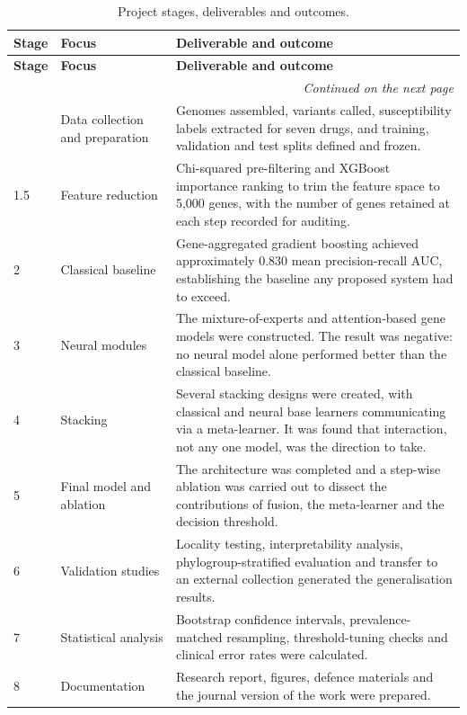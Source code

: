 {\small\setlength{\tabcolsep}{5pt}
\begin{longtable}{|l|>{\raggedright\arraybackslash}p{3.0cm}|>{\raggedright\arraybackslash}p{9.6cm}|}
\caption{Project stages, deliverables and outcomes.}
\label{tab:phases}\\
\hline
\textbf{Stage} & \textbf{Focus} & \textbf{Deliverable and outcome} \\
\hline
\endfirsthead
\hline
\textbf{Stage} & \textbf{Focus} & \textbf{Deliverable and outcome} \\
\hline
\endhead
\hline
\multicolumn{3}{r}{\footnotesize\textit{Continued on the next page}}\\
\endfoot
\hline
\endlastfoot
1 & Data collection and preparation &
Genomes assembled, variants called, susceptibility labels extracted for seven drugs, and
training, validation and test splits defined and frozen. \\
\hline
1.5 & Feature reduction &
Chi-squared pre-filtering and XGBoost importance ranking to trim the feature space to
5{,}000 genes, with the number of genes retained at each step recorded for auditing. \\
\hline
2 & Classical baseline &
Gene-aggregated gradient boosting achieved approximately 0.830 mean precision-recall AUC,
establishing the baseline any proposed system had to exceed. \\
\hline
3 & Neural modules &
The mixture-of-experts and attention-based gene models were constructed. The result was
negative: no neural model alone performed better than the classical baseline. \\
\hline
4 & Stacking &
Several stacking designs were created, with classical and neural base learners communicating
via a meta-learner. It was found that interaction, not any one model, was the direction to
take. \\
\hline
5 & Final model and ablation &
The architecture was completed and a step-wise ablation was carried out to dissect the
contributions of fusion, the meta-learner and the decision threshold. \\
\hline
6 & Validation studies &
Locality testing, interpretability analysis, phylogroup-stratified evaluation and transfer to
an external collection generated the generalisation results. \\
\hline
7 & Statistical analysis &
Bootstrap confidence intervals, prevalence-matched resampling, threshold-tuning checks and
clinical error rates were calculated. \\
\hline
8 & Documentation &
Research report, figures, defence materials and the journal version of the work were prepared. \\
\end{longtable}}

